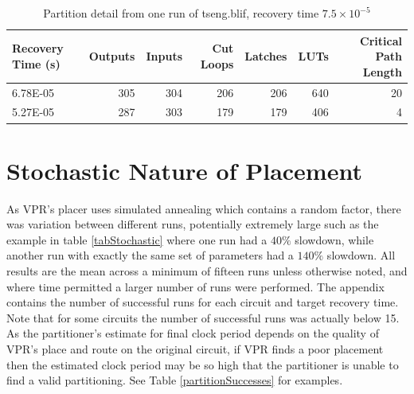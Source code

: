 \documentclass[12pt,final,oneside]{dwThesis} %
\begin{document}
   \begin{table}

      \begin{tabular}
         {lrrrrrr} \toprule Recovery Time (s) &
         Outputs & Inputs & Cut Loops & Latches & \glspl{LUT} & Critical
         Path Length\\
         \midrule 6.78E-05 & 305 & 304 & 206 & 206 & 640 &
         20\\
         5.27E-05 & 287 & 303 & 179 & 179 & 406 & 4\\
         \bottomrule

      \end{tabular}
      \caption{Partition detail from one run of tseng.blif,
         recovery time $7.5\times10^{-5}$}\label{tabSanityPartitions}

   \end{table}



   \section{Stochastic Nature of Placement}\label{stochastic}
   As \gls{VPR}'s placer uses
   simulated annealing which contains a random factor, there was variation
   between different runs, potentially extremely large such as the example in
   table \ref{tabStochastic} where one run had a $40\%$ slowdown, while another
   run with exactly the same set of parameters had a $140\%$ slowdown.
   All results are the mean across a minimum of fifteen runs unless otherwise noted, and where time permitted a larger number of runs were performed.
   The appendix contains the number of successful runs for each circuit and target recovery time.
   Note that for some circuits the number of successful runs was actually below 15.
   As the partitioner's estimate for final clock period depends on the quality of \gls{VPR}'s place and route on the original circuit,
   if \gls{VPR} finds a poor placement then the estimated clock period may be so high that the partitioner is unable to find a valid partitioning.
   See Table \ref{partitionSuccesses} for examples.
   
\end{document}
